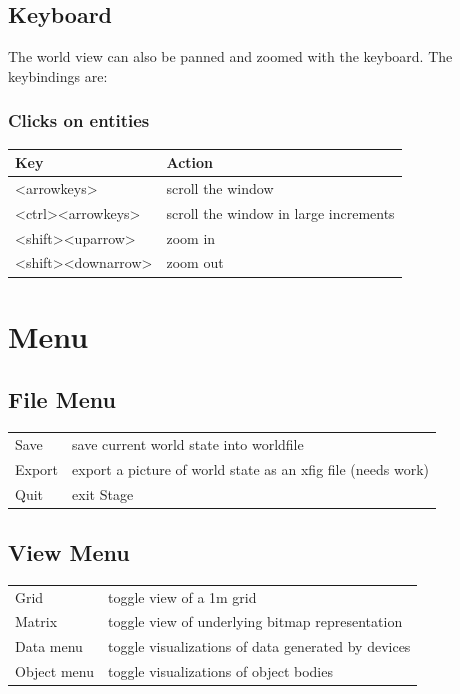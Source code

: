 \documentclass[11pt,twoside]{report}
\begin{document}
\subsection{Keyboard}
The world view can also be panned and zoomed with the keyboard. The
keybindings are:

\subsubsection*{Clicks on entities}
\begin{tabular}{|l|l|}
\hline Key & Action\\ \hline
<arrowkeys>        & scroll the window \\
<ctrl><arrowkeys>  & scroll the window in large increments \\
<shift><uparrow>   & zoom in \\
<shift><downarrow> & zoom out \\
\hline 
\end{tabular}

\section{Menu}

\subsection{File Menu}

\begin{tabular}{|l|l|}
\hline 
Save & save current world state into worldfile\\
Export & export a picture of world state as an xfig file (needs work)\\
Quit & exit Stage\\
\hline
\end{tabular}

\subsection{View Menu}

\begin{tabular}{|l|l|}
\hline 
Grid & toggle view of a 1m grid\\
Matrix & toggle view of underlying bitmap representation\\
Data menu & toggle visualizations of data generated by devices\\
Object menu & toggle visualizations of object bodies\\
\hline
\end{tabular}
\end{document}

